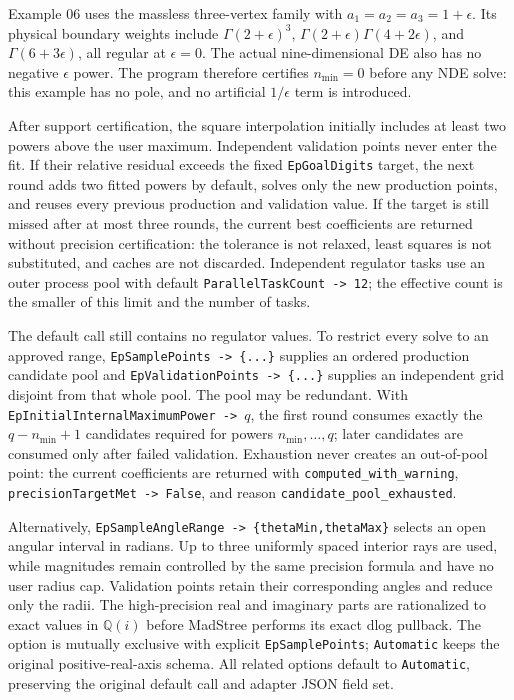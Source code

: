 \documentclass[11pt,a4paper]{article}
\begin{document}
Example 06 uses the massless three-vertex family with
$a_1=a_2=a_3=1+\epsilon$.  Its physical boundary weights include
$\Gamma(2+\epsilon)^3$, $\Gamma(2+\epsilon)\Gamma(4+2\epsilon)$, and
$\Gamma(6+3\epsilon)$, all regular at $\epsilon=0$.  The actual nine-dimensional DE also has
no negative $\epsilon$ power.  The program therefore certifies $n_{\min}=0$ before any NDE
solve: this example has no pole, and no artificial $1/\epsilon$ term is introduced.

After support certification, the square interpolation initially includes at least two powers
above the user maximum.  Independent validation points never enter the fit.  If their relative
residual exceeds the fixed \texttt{EpGoalDigits} target, the next round adds two fitted powers
by default, solves only the new production points, and reuses every previous production and
validation value.  If the target is still missed after at most three rounds, the current best
coefficients are returned without precision certification: the tolerance is not relaxed,
least squares is not substituted, and caches are not discarded.  Independent regulator tasks
use an outer process pool with default \texttt{ParallelTaskCount -> 12}; the effective count is
the smaller of this limit and the number of tasks.

The default call still contains no regulator values.  To restrict every solve to an approved
range, \texttt{EpSamplePoints -> \{...\}} supplies an ordered production candidate pool and
\texttt{EpValidationPoints -> \{...\}} supplies an independent grid disjoint from that whole
pool.  The pool may be redundant.  With
\texttt{EpInitialInternalMaximumPower -> $q$}, the first round consumes exactly the
$q-n_{\min}+1$ candidates required for powers $n_{\min},\ldots,q$; later candidates are consumed
only after failed validation.  Exhaustion never creates an out-of-pool point: the current
coefficients are returned with \texttt{computed\_with\_warning},
\texttt{precisionTargetMet -> False}, and reason \texttt{candidate\_pool\_exhausted}.

Alternatively, \texttt{EpSampleAngleRange -> \{thetaMin,thetaMax\}} selects an open angular
interval in radians.  Up to three uniformly spaced interior rays are used, while magnitudes remain
controlled by the same precision formula and have no user radius cap.  Validation points retain
their corresponding angles and reduce only the radii.  The high-precision real and imaginary parts
are rationalized to exact values in $\mathbb Q(i)$ before MadStree performs its exact dlog pullback.
The option is mutually exclusive with explicit \texttt{EpSamplePoints}; \texttt{Automatic} keeps
the original positive-real-axis schema.
All related options default to \texttt{Automatic}, preserving the original default call and
adapter JSON field set.
\end{document}

